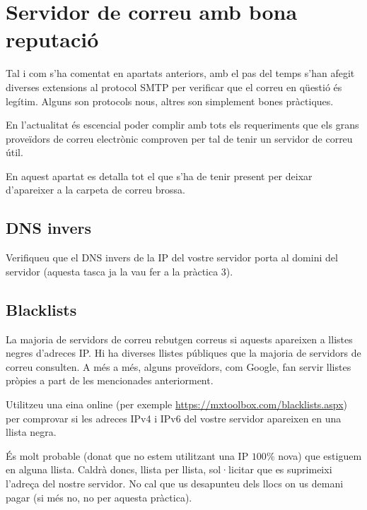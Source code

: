 \documentclass{practicaitic}
\begin{document}
\section{Servidor de correu amb bona reputació}
\label{sec:reputation}

Tal i com s'ha comentat en apartats anteriors, amb el pas del temps s'han
afegit diverses extensions al protocol SMTP per verificar que el correu en
qüestió és legítim. Alguns son protocols nous, altres son simplement bones
pràctiques.

En l'actualitat és escencial poder complir amb tots els requeriments que els
grans proveïdors de correu electrònic comproven per tal de tenir un servidor
de correu útil.

En aquest apartat es detalla tot el que s'ha de tenir present per deixar
d'apareixer a la carpeta de correu brossa.

\subsection{DNS invers}

\begin{tasca}
  Verifiqueu que el DNS invers de la IP del vostre servidor porta al domini
  del servidor (aquesta tasca ja la vau fer a la pràctica 3).
\end{tasca}

\subsection{Blacklists}

La majoria de servidors de correu rebutgen correus si aquests apareixen a
llistes negres d'adreces IP. Hi ha diverses llistes públiques que la majoria
de servidors de correu consulten.
A més a més, alguns proveïdors, com Google, fan servir llistes pròpies a part
de les mencionades anteriorment.

\begin{tasca}
  Utilitzeu una eina online (per exemple \url{https://mxtoolbox.com/blacklists.aspx})
  per comprovar si les adreces IPv4 i IPv6 del vostre servidor apareixen en una
  llista negra.
\end{tasca}

És molt probable (donat que no estem utilitzant una IP $100\%$ nova) que
estiguem en alguna llista. Caldrà doncs, llista per llista, sol·licitar
que es suprimeixi l'adreça del nostre servidor. No cal que us desapunteu
dels llocs on us demani pagar (si més no, no per aquesta pràctica).
\end{document}
